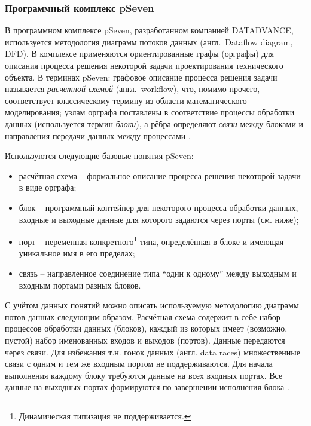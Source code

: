 \subsubsection{Программный комплекс pSeven}

В программном комплексе \textsf{pSeven}, разработанном компанией DATADVANCE, используется методология диаграмм потоков данных (англ.~Dataflow diagram, DFD). В комплексе применяются ориентированные графы (орграфы) для описания процесса решения некоторой задачи проектирования технического объекта. В терминах \textsf{pSeven}: графовое описание процесса решения задачи называется \textit{расчетной схемой} (англ.~workflow), что, помимо прочего, соответствует классическому термину из области математического моделирования; узлам орграфа поставлены в соответствие процессы обработки данных (используется термин \textit{блоки}), а рёбра определяют \textit{связи} между блоками и направления передачи данных между процессами \cite{Nazarenko2015}. 

Используются следующие базовые понятия \textsf{pSeven}:
\begin{itemize}
    \item \textsf{расчётная схема} -- формальное описание процесса решения некоторой задачи в виде орграфа;
    \item \textsf{блок} -- программный контейнер для некоторого процесса обработки данных, входные и выходные данные для которого задаются через порты (см. ниже);
    \item \textsf{порт} -- переменная конкретного\footnote{Динамическая типизация не поддерживается.} типа, определённая в блоке и имеющая уникальное имя в его пределах;
    \item \textsf{связь} -- направленное соединение типа ``один к одному'' между выходным и входным портами разных блоков.
\end{itemize}

С учётом данных понятий можно описать используемую методологию диаграмм потов данных следующим образом. Расчётная схема содержит в себе набор процессов обработки данных (блоков), каждый из которых имеет (возможно, пустой) набор именованных входов и выходов (портов). Данные передаются через связи. Для избежания т.н. гонок данных (англ. data races) множественные связи с одним и тем же входным портом не поддерживаются. Для начала выполнения каждому блоку требуются данные на всех входных портах. Все данные на выходных портах формируются по завершении исполнения блока \cite{Nazarenko2015}.

